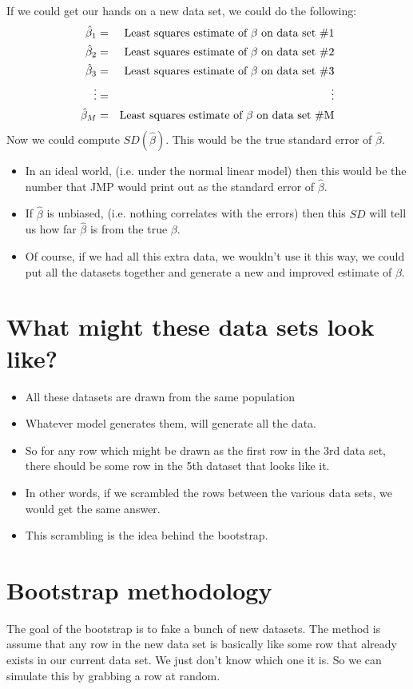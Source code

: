 \documentclass{article}
\begin{document}
If we could get our hands on a new data set, we could do the
following: 
\begin{eqnarray*}
\hat\beta_1 &=& \hbox{Least squares estimate of $\beta$ on data set \#1}\\
\hat\beta_2 &=& \hbox{Least squares estimate of $\beta$ on data set \#2}\\
\hat\beta_3 &=& \hbox{Least squares estimate of $\beta$ on data set \#3}\\
\vdots &=& \vdots \\
\hat\beta_M &=& \hbox{Least squares estimate of $\beta$ on data set \#M}
\end{eqnarray*}
Now we could compute $SD(\hat\beta)$.  This would be the true standard
error of $\hat\beta$.
\begin{itemize}
\item In an ideal world, (i.e. under the normal linear model) then this
would be the number that JMP would print out as the standard error of
$\hat\beta$.
\item If $\hat\beta$ is unbiased, (i.e. nothing correlates with the
errors) then this $SD$ will tell us how far $\hat\beta$ is from the
true $\beta$.
\item Of course, if we had all this extra data, we wouldn't use it
this way, we could put all the datasets together and generate a new
and improved estimate of $\beta$.
\end{itemize}

\section{What might these data sets look like?}
\begin{itemize}
\item All these datasets are drawn from the same population
\item Whatever model generates them, will generate all the data.
\item So for any row which might be drawn as the first row in the 3rd
data set, there should be some row in the 5th dataset that looks like
it.
\item In other words, if we scrambled the rows between the various
data sets, we would get the same answer.
\item This scrambling is the idea behind the bootstrap.
\end{itemize}

\section{Bootstrap methodology}
The goal of the bootstrap is to fake a bunch of new datasets.  The
method is assume that any row in the new data set is basically like
some row that already exists in our current data set.  We just don't
know which one it is.  So we can simulate this by grabbing a row at
random.
\end{document}
